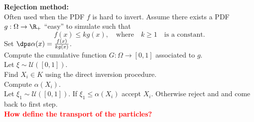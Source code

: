 \documentclass[10 pt]{beamer}
\begin{document}
\begin{frame}
  \vspace{0.3 cm}
    \textcolor{cadmiumgreen}{\textbf{Rejection method:}}
    \\
    \vspace{0.1 cm}
    Often used when the PDF $f$ is hard to invert. Assume there exists a PDF $g : \Omega \rightarrow \R_{+}$ ``easy'' to simulate such that
    \begin{equation*}
f(x) \leq k g(x), \quad \text{where} \quad k \geq 1 \quad \text{is a constant}. 
      \end{equation*}
    Set $\dps \alpha(x)=\frac{f(x)}{k g(x)}$.
    \\
    \vspace*{0.2 cm}
    Compute the cumulative function $G:\Omega \rightarrow [0,1]$ associated to $g$.\\
    \vspace*{0.2 cm}
    Let $\xi \sim \mathcal{U}([0,1])$. \\
    \vspace*{0.2 cm}
    Find ${X}_i \in K$ using the direct inversion procedure.    \\
    \vspace*{0.2 cm}
    Compute $\alpha({X}_i)$.
    \\
    \vspace*{0.2 cm}
    Let $\xi_1 \sim \mathcal{U}([0,1])$. If $\xi_1 \leq \alpha ({X}_i)$ accept ${X}_i$. Otherwise reject and and come back to first step.
    \\
    \vspace*{0.3 cm}
    \textcolor{red}{\textbf{How define the transport of the particles?}}
\end{frame}
%
\end{document}
